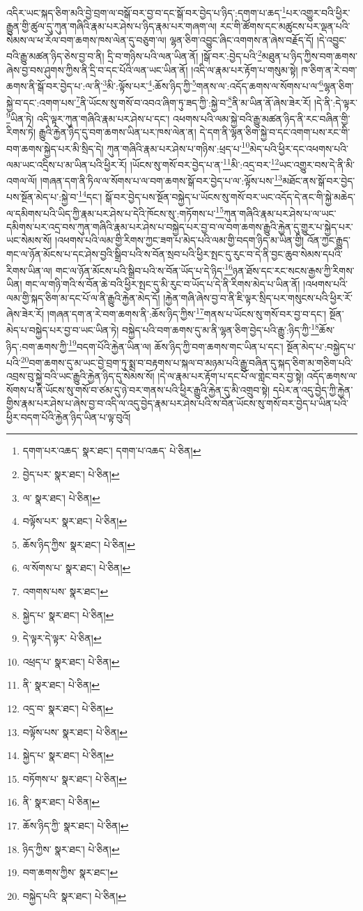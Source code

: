 འདིར་ཡང་སྐད་ཅིག་མའི་བྱེ་བྲག་ལ་བསྒོ་བར་བྱ་བ་དང་སྒོ་བར་བྱེད་པ་ཉིད་:དགག་པ་ཆད་\footnote{དགག་པར་འཆད་  སྣར་ཐང་། དགག་པ་འཆད་  པེ་ཅིན། }པར་འགྱུར་བའི་ཕྱིར་རྒྱུན་གྱི་ཚུལ་དུ་ཀུན་གཞིའི་རྣམ་པར་ཤེས་པ་ཉིད་རྣམ་པར་གཞག་ལ། རང་གི་ཚོགས་དང་མཚུངས་པར་ལྡན་པའི་སེམས་ལ་ཕ་རོལ་བག་ཆགས་ཁས་ལེན་དུ་བཅུག་ལ། ལྷན་ཅིག་འབྱུང་ཞིང་འགགས་ན་ཞེས་བརྗོད་དོ། །དེ་འབྱུང་བའི་རྒྱུ་མཚན་ཉིད་ཅེས་བྱ་བ་ནི། དྲི་བ་གཉིས་པའི་ལན་ཡིན་ནོ། །སྒོ་བར་:བྱེད་པའི་\footnote{བྱེད་པར་  སྣར་ཐང་།  པེ་ཅིན། }མཐུན་པ་ཉིད་ཀྱིས་བག་ཆགས་ཞེས་བྱ་བས་ཤུགས་ཀྱིས་ནི་དྲི་བ་དང་པོའི་ལན་ཡང་ཡིན་ནོ། །འདི་ལ་རྣམ་པར་རྟོག་པ་གསུམ་སྟེ། ཁ་ཅིག་ན་རེ་བག་ཆགས་ནི་སྒོ་བར་བྱེད་པ་:ལ་ནི་\footnote{ལ་  སྣར་ཐང་།  པེ་ཅིན། }མི་:ལྟོས་པར་\footnote{བལྟོས་པར་  སྣར་ཐང་།  པེ་ཅིན། }:ཆོས་ཉིད་ཀྱི་\footnote{ཆོས་ཉིད་ཀྱིས་  སྣར་ཐང་།  པེ་ཅིན། }གནས་ལ་:འདོད་ཆགས་ལ་སོགས་པ་ལ་\footnote{ལ་སོགས་པ་  སྣར་ཐང་།  པེ་ཅིན། }ལྷན་ཅིག་སྐྱེ་བ་དང་:འགག་པས་\footnote{འགགས་པས་  སྣར་ཐང་། }ནི་ཡོངས་སུ་གསོ་བ་འབའ་ཞིག་ཏུ་ཟད་ཀྱི་:སྐྱེ་བ་\footnote{སྐྱེད་པ་  སྣར་ཐང་།  པེ་ཅིན། }ནི་མ་ཡིན་ནོ་ཞེས་ཟེར་རོ། །དེ་ནི་:དེ་ལྟར་\footnote{དེ་ལྟར་དེ་ལྟར་  པེ་ཅིན། }ཡིན་ཏེ། འདི་ལྟར་ཀུན་གཞིའི་རྣམ་པར་ཤེས་པ་དང་། འཕགས་པའི་ལམ་སྐྱེ་བའི་རྒྱུ་མཚན་ཉིད་ནི་རང་བཞིན་གྱི་རིགས་ཏེ། རྒྱུའི་རྐྱེན་ཉིད་དུ་བག་ཆགས་ཡིན་པར་ཁས་ལེན་ན། དེ་དག་ནི་ལྷན་ཅིག་སྐྱེ་བ་དང་འགག་པས་རང་གི་བག་ཆགས་སྐྱེད་པར་མི་སྲིད་དེ། ཀུན་གཞིའི་རྣམ་པར་ཤེས་པ་གཉིས་:ཕྲད་པ་\footnote{འཕྲད་པ་  སྣར་ཐང་།  པེ་ཅིན། }མེད་པའི་ཕྱིར་དང་འཕགས་པའི་ལམ་ཡང་འདྲིས་པ་མ་ཡིན་པའི་ཕྱིར་རོ། །ཡོངས་སུ་གསོ་བར་བྱེད་པ་ན་\footnote{ནི་  སྣར་ཐང་།  པེ་ཅིན། }མི་:འདྲ་བར་\footnote{འདྲ་བ་  སྣར་ཐང་།  པེ་ཅིན། }ཡང་འགྱུར་བས་དེ་ནི་མི་འགལ་ལོ། །གཞན་དག་ནི་ཏིལ་ལ་སོགས་པ་ལ་བག་ཆགས་སྒོ་བར་བྱེད་པ་ལ་:ལྟོས་པས་\footnote{བལྟོས་པས་  སྣར་ཐང་།  པེ་ཅིན། }མཐོང་ནས་སྒོ་བར་བྱེད་པས་སྔོན་མེད་པ་:སྐྱེ་བ་\footnote{སྐྱེད་པ་  སྣར་ཐང་།  པེ་ཅིན། }དང་། སྒོ་བར་བྱེད་པས་སྔོན་བསྐྱེད་པ་ཡོངས་སུ་གསོ་བར་ཡང་འདོད་དེ་ནང་གི་སྐྱེ་མཆེད་ལ་དམིགས་པའི་ཡིད་ཀྱི་རྣམ་པར་ཤེས་པ་དེའི་ཁོངས་སུ་:གཏོགས་པ་\footnote{བཏོགས་པ་  སྣར་ཐང་།  པེ་ཅིན། }ཀུན་གཞིའི་རྣམ་པར་ཤེས་པ་ལ་ཡང་དམིགས་པར་འདྲ་བས་ཀུན་གཞིའི་རྣམ་པར་ཤེས་པ་བསྐྱེད་པར་བྱ་བ་ལ་བག་ཆགས་རྒྱུའི་རྐྱེན་དུ་གྱུར་པ་སྐྱེད་པར་ཡང་སེམས་སོ། །འཕགས་པའི་ལམ་གྱི་རིགས་ཀྱང་ཟག་པ་མེད་པའི་ལམ་གྱི་བདག་ཉིད་མ་ཡིན་གྱི། འོན་ཀྱང་རྒྱུད་གང་ལ་ཉོན་མོངས་པ་དང་ཤེས་བྱའི་སྒྲིབ་པའི་ས་བོན་སྲབ་པའི་ཕྱིར་སྤང་དུ་རུང་བ་དེ་ནི་བྱང་ཆུབ་སེམས་དཔའི་རིགས་ཡིན་ལ། གང་ལ་ཉོན་མོངས་པའི་སྒྲིབ་པའི་ས་བོན་ཡོད་པ་དེ་ཉིད་\footnote{ནི་  སྣར་ཐང་།  པེ་ཅིན། }ཉན་ཐོས་དང་རང་སངས་རྒྱས་ཀྱི་རིགས་ཡིན། གང་ལ་གཉི་གའི་ས་བོན་ཆེ་བའི་ཕྱིར་སྤང་དུ་མི་རུང་བ་ཡོད་པ་དེ་ནི་རིགས་མེད་པ་ཡིན་ནོ། །འཕགས་པའི་ལམ་གྱི་སྐད་ཅིག་མ་དང་པོ་ལ་ནི་རྒྱུའི་རྐྱེན་མེད་དོ། །རྐྱེན་གཞི་ཞེས་བྱ་བ་ནི་ཇི་ལྟར་སྲིད་པར་གསུངས་པའི་ཕྱིར་རོ་ཞེས་ཟེར་རོ། །གཞན་དག་ན་རེ་བག་ཆགས་ནི་:ཆོས་ཉིད་ཀྱིས་\footnote{ཆོས་ཉིད་ཀྱི་  སྣར་ཐང་།  པེ་ཅིན། }གནས་པ་ཡོངས་སུ་གསོ་བར་བྱ་བ་དང་། སྔོན་མེད་པ་བསྐྱེད་པར་བྱ་བ་ཡང་ཡིན་ཏེ། བསྐྱེད་པའི་བག་ཆགས་དུ་མ་ནི་ལྷན་ཅིག་བྱེད་པའི་རྒྱུ་:ཉིད་ཀྱི་\footnote{ཉིད་ཀྱིས་  སྣར་ཐང་།  པེ་ཅིན། }ཆོས་ཉིད་:བག་ཆགས་ཀྱི་\footnote{བག་ཆགས་ཀྱིས་  སྣར་ཐང་། }བདག་པོའི་རྐྱེན་ཡིན་ལ། ཆོས་ཉིད་ཀྱི་བག་ཆགས་གང་ཡིན་པ་དང་། སྔོན་མེད་པ་:བསྐྱེད་པ་པའི་\footnote{བསྐྱེད་པའི་  སྣར་ཐང་།  པེ་ཅིན། }བག་ཆགས་དུ་མ་ཡང་བྱེ་བྲག་ཏུ་སྨྲ་བ་བརྟགས་པ་སྐལ་བ་མཉམ་པའི་རྒྱུ་བཞིན་དུ་སྐད་ཅིག་མ་གཅིག་པའི་འབྲས་བུ་སྐྱེ་བའི་ཡང་རྒྱུའི་རྐྱེན་ཉིད་དུ་སེམས་སོ། །དེ་ལ་རྣམ་པར་རྟོག་པ་དང་པོ་ལ་གླེང་བར་བྱ་སྟེ། འདོད་ཆགས་ལ་སོགས་པ་ནི་ཡོངས་སུ་གསོ་བ་ཙམ་དུ་ཉེ་བར་གནས་པའི་ཕྱིར་རྒྱུའི་རྐྱེན་དུ་མི་འགྲུབ་སྟེ། དཔེར་ན་འདུ་བྱེད་ཀྱི་རྐྱེན་གྱིས་རྣམ་པར་ཤེས་པ་ཞེས་བྱ་བ་འདི་ལ་འདུ་བྱེད་རྣམ་པར་ཤེས་པའི་ས་བོན་ཡོངས་སུ་གསོ་བར་བྱེད་པ་ཡིན་པའི་ཕྱིར་བདག་པོའི་རྐྱེན་ཉིད་ཡིན་པ་ལྟ་བུའོ། 